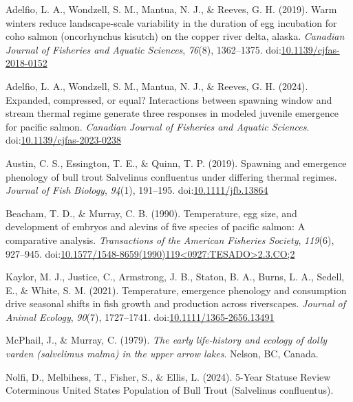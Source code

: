 \documentclass[12pt,halfline,a4paper,]{ouparticle}
\newlength{\cslhangindent}
\newenvironment{CSLReferences}[2] %
 {\begin{list}{}{%
  \setlength{\itemindent}{0pt}
  \setlength{\leftmargin}{0pt}
  \setlength{\parsep}{0pt}
  \ifodd #1
   \setlength{\leftmargin}{\cslhangindent}
   \setlength{\itemindent}{-1\cslhangindent}
  \fi
  \setlength{\itemsep}{#2\baselineskip}}}
 {\end{list}}
\begin{document}
\label{refs}
\begin{CSLReferences}{1}{0}
Adelfio, L. A., Wondzell, S. M., Mantua, N. J., \& Reeves, G. H. (2019).
Warm winters reduce landscape-scale variability in the duration of egg
incubation for coho salmon (oncorhynchus kisutch) on the copper river
delta, alaska. \emph{Canadian Journal of Fisheries and Aquatic
Sciences}, \emph{76}(8), 1362--1375.
doi:\href{https://doi.org/10.1139/cjfas-2018-0152}{10.1139/cjfas-2018-0152}

Adelfio, L. A., Wondzell, S. M., Mantua, N. J., \& Reeves, G. H. (2024).
Expanded, compressed, or equal? Interactions between spawning window and
stream thermal regime generate three responses in modeled juvenile
emergence for pacific salmon. \emph{Canadian Journal of Fisheries and
Aquatic Sciences}.
doi:\href{https://doi.org/10.1139/cjfas-2023-0238}{10.1139/cjfas-2023-0238}

Austin, C. S., Essington, T. E., \& Quinn, T. P. (2019). Spawning and
emergence phenology of bull trout Salvelinus confluentus under differing
thermal regimes. \emph{Journal of Fish Biology}, \emph{94}(1), 191--195.
doi:\href{https://doi.org/10.1111/jfb.13864}{10.1111/jfb.13864}

Beacham, T. D., \& Murray, C. B. (1990). Temperature, egg size, and
development of embryos and alevins of five species of pacific salmon: A
comparative analysis. \emph{Transactions of the American Fisheries
Society}, \emph{119}(6), 927--945.
doi:\href{https://doi.org/10.1577/1548-8659(1990)119\%3C0927:TESADO\%3E2.3.CO;2}{10.1577/1548-8659(1990)119\textless0927:TESADO\textgreater2.3.CO;2}

Kaylor, M. J., Justice, C., Armstrong, J. B., Staton, B. A., Burns, L.
A., Sedell, E., \& White, S. M. (2021). Temperature, emergence phenology
and consumption drive seasonal shifts in fish growth and production
across riverscapes. \emph{Journal of Animal Ecology}, \emph{90}(7),
1727--1741.
doi:\href{https://doi.org/10.1111/1365-2656.13491}{10.1111/1365-2656.13491}

McPhail, J., \& Murray, C. (1979). \emph{The early life-history and
ecology of dolly varden (salvelimus malma) in the upper arrow lakes}.
Nelson, BC, Canada.

Nolfi, D., Melbihess, T., Fisher, S., \& Ellis, L. (2024). 5-Year
Statuse Review Coterminous United States Population of Bull Trout
(Salvelinus confluentus).


\end{CSLReferences}
\end{document}

